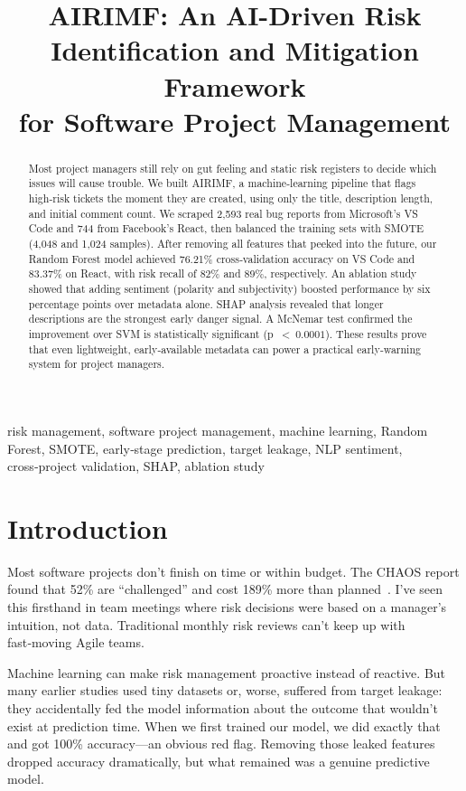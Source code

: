 \documentclass[conference]{IEEEtran}
\title{AIRIMF: An AI-Driven Risk Identification and Mitigation Framework\\for Software Project Management}
\author{
\IEEEauthorblockN{Mandadi Vinay Kumar}
\IEEEauthorblockA{Department of Computer Science and Engineering\\
Lovely Professional University\\
Punjab, India\\
mvkchowdary20@gmail.com}
}
\begin{document}
\maketitle

\begin{abstract}
Most project managers still rely on gut feeling and static risk registers to decide which issues will cause trouble. We built AIRIMF, a machine‑learning pipeline that flags high‑risk tickets the moment they are created, using only the title, description length, and initial comment count. We scraped 2,593 real bug reports from Microsoft's VS Code and 744 from Facebook's React, then balanced the training sets with SMOTE (4,048 and 1,024 samples). After removing all features that peeked into the future, our Random Forest model achieved 76.21\% cross‑validation accuracy on VS Code and 83.37\% on React, with risk recall of 82\% and 89\%, respectively. An ablation study showed that adding sentiment (polarity and subjectivity) boosted performance by six percentage points over metadata alone. SHAP analysis revealed that longer descriptions are the strongest early danger signal. A McNemar test confirmed the improvement over SVM is statistically significant (p~$<~0.0001$). These results prove that even lightweight, early‑available metadata can power a practical early‑warning system for project managers.
\end{abstract}

\begin{IEEEkeywords}
risk management, software project management, machine learning, Random Forest, SMOTE, early‑stage prediction, target leakage, NLP sentiment, cross‑project validation, SHAP, ablation study
\end{IEEEkeywords}

\section{Introduction}
Most software projects don't finish on time or within budget. The CHAOS report found that 52\% are ``challenged'' and cost 189\% more than planned~\cite{chaos2020}. I've seen this firsthand in team meetings where risk decisions were based on a manager's intuition, not data. Traditional monthly risk reviews can't keep up with fast‑moving Agile teams.

Machine learning can make risk management proactive instead of reactive. But many earlier studies used tiny datasets or, worse, suffered from target leakage: they accidentally fed the model information about the outcome that wouldn't exist at prediction time. When we first trained our model, we did exactly that and got 100\% accuracy—an obvious red flag. Removing those leaked features dropped accuracy dramatically, but what remained was a genuine predictive model.
\end{document}
